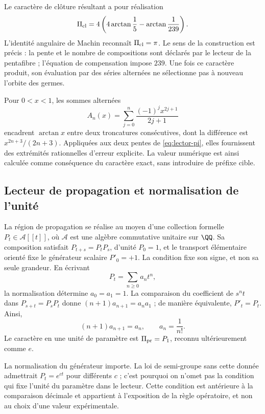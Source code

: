 Le caractère de clôture résultant a pour réalisation
\begin{equation}
 \Pi_{\rm cl}=4\left(4\arctan\frac15-\arctan\frac1{239}\right).
 \label{eq:lector-pi}
\end{equation}
L'identité angulaire de Machin reconnaît \(\Pi_{\rm cl}=\pi\). Le sens de la construction est précis : la pente et le nombre de compositions sont déclarés par le lecteur de la pentafibre ; l'équation de compensation impose \(239\). Une fois ce caractère produit, son évaluation par des séries alternées ne sélectionne pas à nouveau l'orbite des germes.

Pour \(0<x<1\), les sommes alternées
\[
 A_n(x)=\sum_{j=0}^n\frac{(-1)^jx^{2j+1}}{2j+1}
\]
encadrent \(\arctan x\) entre deux troncatures consécutives, dont la différence est \(x^{2n+3}/(2n+3)\). Appliquées aux deux pentes de \eqref{eq:lector-pi}, elles fournissent des extrémités rationnelles d'erreur explicite. La valeur numérique est ainsi calculée comme conséquence du caractère exact, sans introduire de préfixe cible.

\subsection{Lecteur de propagation et normalisation de l'unité}

La région de propagation se réalise au moyen d'une collection formelle \(P_t\in\mathcal A[[t]]\), où \(\mathcal A\) est une algèbre commutative unitaire sur \(\QQ\). Sa composition satisfait \(P_{t+s}=P_tP_s\), d'unité \(P_0=1\), et le transport élémentaire orienté fixe le générateur scalaire \(P'_0=+1\). La condition fixe son signe, et non sa seule grandeur. En écrivant
\[
 P_t=\sum_{n\ge0}a_nt^n,
\]
la normalisation détermine \(a_0=a_1=1\). La comparaison du coefficient de \(s^nt\) dans \(P_{s+t}=P_sP_t\) donne \((n+1)a_{n+1}=a_na_1\) ; de manière équivalente, \(P'_t=P_t\). Ainsi,
\begin{equation}
 (n+1)a_{n+1}=a_n,\qquad a_n=\frac1{n!}.
 \label{eq:propagacion}
\end{equation}
Le caractère en une unité de paramètre est \(\Pi_{\rm pr}=P_1\), reconnu ultérieurement comme \(e\).

La normalisation du générateur importe. La loi de semi-groupe sans cette donnée admettrait \(P_t=e^{ct}\) pour différents \(c\) ; c'est pourquoi on n'omet pas la condition qui fixe l'unité du paramètre dans le lecteur. Cette condition est antérieure à la comparaison décimale et appartient à l'exposition de la règle opératoire, et non au choix d'une valeur expérimentale.

